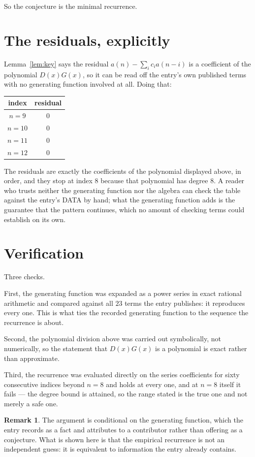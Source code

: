 \documentclass[11pt,a4paper]{article}
\theoremstyle{plain}
\theoremstyle{definition}
\newtheorem{remark}[theorem]{Remark}
\begin{document}
So the conjecture is the minimal recurrence.

\section{The residuals, explicitly}

Lemma~\ref{lem:key} says the residual $a(n)-\sum_ic_ia(n-i)$ is a coefficient of the
polynomial $D(x)G(x)$, so it can be read off the entry's own published terms with no
generating function involved at all. Doing that:
\begin{center}
\begin{tabular}{cc}
index & residual \\ \hline
$n=9$ & $0$ \\
$n=10$ & $0$ \\
$n=11$ & $0$ \\
$n=12$ & $0$
\end{tabular}
\end{center}
The residuals are exactly the coefficients of the polynomial displayed above, in order, and
they stop at index $8$ because that polynomial has degree $8$. A reader who trusts
neither the generating function nor the algebra can check the table against the entry's DATA
by hand; what the generating function adds is the guarantee that the pattern continues, which
no amount of checking terms could establish on its own.

\section{Verification}

Three checks.

First, the generating function was expanded as a power series in exact rational arithmetic and
compared against all $23$ terms the entry publishes: it reproduces every one. This is
what ties the recorded generating function to the sequence the recurrence is about.

Second, the polynomial division above was carried out symbolically, not numerically, so the
statement that $D(x)G(x)$ is a polynomial is exact rather than approximate.

Third, the recurrence was evaluated directly on the series coefficients for sixty consecutive
indices beyond $n=8$ and holds at every one, and at $n=8$ itself it fails --- the
degree bound is attained, so the range stated is the true one and not merely a safe one.

\begin{remark}
The argument is conditional on the generating function, which the entry records as a fact and
attributes to a contributor rather than offering as a conjecture. What is shown here is that
the empirical recurrence is not an independent guess: it is equivalent to information the
entry already contains.
\end{remark}
\end{document}
